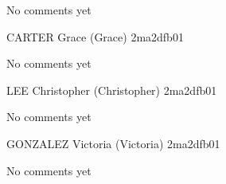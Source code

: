 \documentclass[11pt]{article}
\begin{document}
No comments yet

\newpage

CARTER Grace (Grace) \hfill 2ma2dfb01 \\

\noindent
\begin{minipage}[t]{0.49\textwidth}
\centering
{}
\end{minipage}
\hfill
\begin{minipage}[t]{0.49\textwidth}
\centering
{}
\end{minipage}

No comments yet

\newpage

LEE Christopher (Christopher) \hfill 2ma2dfb01 \\

\noindent
\begin{minipage}[t]{0.49\textwidth}
\centering
{}
\end{minipage}
\hfill
\begin{minipage}[t]{0.49\textwidth}
\centering
{}
\end{minipage}

No comments yet

\newpage

GONZALEZ Victoria (Victoria) \hfill 2ma2dfb01 \\

\noindent
\begin{minipage}[t]{0.49\textwidth}
\centering
{}
\end{minipage}
\hfill
\begin{minipage}[t]{0.49\textwidth}
\centering
{}
\end{minipage}

No comments yet
\end{document}
